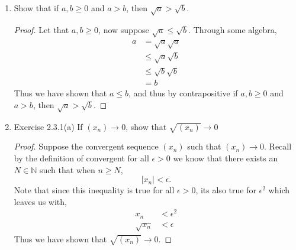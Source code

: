 \documentclass[12pt]{article}
\makeatletter
\theoremstyle{homework}
\newenvironment{exercise}[1]
{\def\@currentlabel{#1}\exercisecore}
{\endexercisecore}
\newcommand{\Nats}{\ensuremath{\mathbb N}}
\makeatother
\begin{document}
\begin{exercise}{Supplemental 2}

\begin{enumerate}
	\item Show that if $a,b\ge 0$ and $a>b$, then $\sqrt{a}>\sqrt{b}$.\\
	
  \begin{proof}Let that $a,b\ge 0$, now suppose $\sqrt{a} \le \sqrt{b}$. Through some algebra,
    \begin{align*}
      a &= \sqrt{a}\sqrt{a}\\
      &\le \sqrt{a}\sqrt{b}\\
      &\le \sqrt{b}\sqrt{b}\\
      &= b
    \end{align*}
    Thus we have shown that $a \le b$, and thus by contrapositive if  $a,b\ge 0$ and $a>b$, then $\sqrt{a}>\sqrt{b}$.
  \end{proof}
  \vspace{.25in}




\item Exercise 2.3.1(a) If $(x_n) \to 0$, show that $\sqrt{(x_n)} \to 0$\\

\begin{proof}
  Suppose the convergent sequence $(x_n)$ such that $(x_n) \to 0$. Recall by the definition of convergent
  for all $\epsilon > 0$ we know that there exists an $N \in \Nats$ such that when $n\geq N$, 
  \begin{equation*}
    |x_n| < \epsilon.
  \end{equation*}
  Note that since this inequality is true for all $\epsilon > 0$, its also true for $\epsilon^2$ which leaves us with, 
  \begin{align*}
    x_n &< \epsilon^2\\
    \sqrt{x_n} &< \epsilon
  \end{align*}
  Thus we have shown that $\sqrt{(x_n)} \to 0$.
\end{proof}

\end{enumerate}
\end{exercise}
\vspace{.5in}
\end{document}
